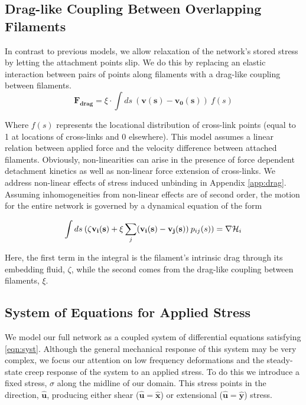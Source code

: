 \documentclass[pre,preprint]{revtex4-1}
\begin{document}
\subsection{Drag-like Coupling Between Overlapping Filaments}
\label{exp_drag}
In contrast to previous models, we allow relaxation of the network's stored stress by letting the attachment points slip.  We do this by replacing an elastic interaction between pairs of points along filaments with a drag-like coupling between filaments.
\begin{equation}
\mathbf{F_{drag}} = \xi \cdot \int ds \: (\mathbf{v(s)}-\mathbf{v_0(s)}) \: f(s)
\end{equation}

Where $f(s)$ represents the locational distribution of cross-link points (equal to 1 at locations of cross-links and 0 elsewhere).  This model assumes a linear relation between applied force and the velocity difference between attached filaments.  Obviously, non-linearities can arise in the presence of force dependent detachment kinetics as well as non-linear force extension of cross-links. We address non-linear effects of stress induced unbinding in Appendix \ref{app:drag}.  Assuming inhomogeneities from non-linear effects are of second order, the motion for the entire network is governed by a dynamical equation of the form

\begin{equation}
\label{eqn:syst}
\int ds \: (\mathbf{\zeta v_i(s)} + \xi \sum _j(\mathbf{v_i(s)}-\mathbf{v_j(s)}) \: p_{ij}(s))= \nabla {\cal H}_i
\end{equation}

Here, the first term in the integral is the filament's intrinsic drag through its embedding fluid, $\zeta$, while the second comes from the drag-like coupling between filaments, $\xi$.  


\subsection{System of Equations for Applied Stress}
We model our full network as a coupled system of differential equations satisfying \ref{eqn:syst}.  Although the general mechanical response of this system may be very complex, we focus our attention on low frequency deformations and the steady-state creep response of the system to an applied stress.  To do this we introduce a fixed stress, $\sigma$ along the midline of our domain.  This stress points in the direction, $\mathbf{\hat{u}}$, producing either shear ($\mathbf{\hat{u}}=\mathbf{\hat{x}}$) or extensional ($\mathbf{\hat{u}}=\mathbf{\hat{y}}$) stress.
\end{document}
